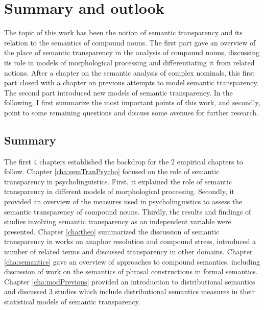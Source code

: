 \chapter{Summary and outlook}
\label{cha:conclusion}

The topic of this work has been the notion of semantic transparency
and its relation to the semantics of compound nouns. The first part
gave an overview of the place of semantic transparency in the analysis of compound
nouns, discussing its role in models of morphological
processing and differentiating it from related notions. After a chapter on the semantic analysis of
complex nominals, this first part closed with a chapter on previous attempts to model semantic transparency. The second part introduced new models
of semantic transparency.
In the following, I first summarize the most important points
of this work, and secondly, point to
some remaining questions and discuss some avenues for further research.

\section{Summary}
\label{sec:summary}

The first 4 chapters established the backdrop for the 2 empirical
chapters to follow. Chapter \ref{cha:semTranPsycho} focused on the
role of semantic transparency in psycholinguistics. First, it explained
the role of semantic transparency in different models of morphological
processing. Secondly, it provided an overview of the measures used in
psycholinguistics to assess the semantic transparency of compound
nouns. Thirdly, the results and findings of studies involving semantic
transparency as an independent variable were presented. Chapter
\ref{cha:theo} summarized the discussion of semantic
transparency in works on anaphor resolution and compound stress,
introduced a number of related terms and discussed transparency in
other domains. Chapter \ref{cha:semantics} gave an overview of
approaches to compound semantics, including discussion of work on the
semantics of phrasal constructions in formal semantics. Chapter
\ref{cha:modPrevious} provided an introduction to distributional
semantics and discussed 3 studies which include distributional
semantics measures in their statistical models of semantic
transparency.

